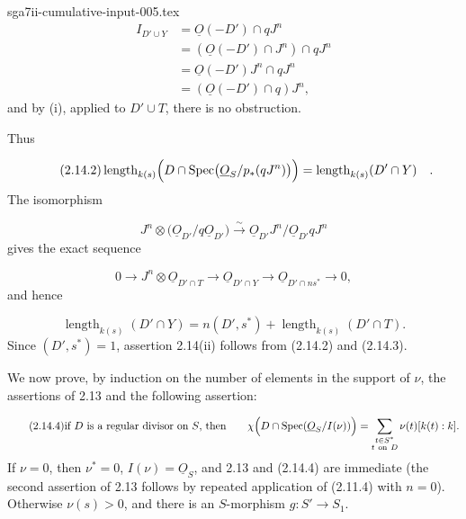 \begin{filecontents*}{sga7ii-cumulative-input-005.tex}
\begin{equation*}
\begin{aligned}
I_{D'\cup Y}
&=\underline{O}(-D')\cap qJ^n\\
&=(\underline{O}(-D')\cap J^n)\cap qJ^n\\
&=\underline{O}(-D')J^n\cap qJ^n\\
&=(\underline{O}(-D')\cap q)J^n,
\end{aligned}
\end{equation*}
and by (i), applied to $D'\cup T$, there is no obstruction.

Thus

\begin{equation}\tag{2.14.2}
\operatorname{length}_{k(s)}
\Bigl(D\cap
\operatorname{Spec}\bigl(\underline{O}_S/p_*(qJ^n)\bigr)\Bigr)
=\operatorname{length}_{k(s)}(D'\cap Y) \quad .
\end{equation}
The isomorphism

\begin{equation*}
J^n\otimes
\bigl(\underline{O}_{D'}/q\underline{O}_{D'}\bigr)
\xrightarrow{\;\sim\;}
\underline{O}_{D'}J^n/
\underline{O}_{D'}qJ^n
\end{equation*}
gives the exact sequence

\begin{equation*}
0\longrightarrow
J^n\otimes\underline{O}_{D'\cap T}
\longrightarrow\underline{O}_{D'\cap Y}
\longrightarrow\underline{O}_{D'\cap ns^*}
\longrightarrow0,
\end{equation*}
and hence


\begin{equation}\tag{2.14.3}
\operatorname{length}_{k(s)}(D'\cap Y)
=n(D',s^*)+\operatorname{length}_{k(s)}(D'\cap T).
\end{equation}
Since $(D',s^*)=1$, assertion 2.14(ii) follows from (2.14.2) and (2.14.3).

We now prove, by induction on the number of elements in the support of $\nu$,
the assertions of 2.13 and the following assertion:

\begin{equation}\tag{2.14.4}
\text{if $D$ is a regular divisor on $S$, then}\qquad
\chi\Bigl(D\cap\operatorname{Spec}(\underline{O}_S/I(\nu))\Bigr)
=\sum_{\substack{t\in S^*\\t\ \mathrm{on}\ D}}
\nu(t)[k(t):k].
\end{equation}
If $\nu=0$, then $\nu^*=0$, $I(\nu)=\underline{O}_S$, and 2.13 and (2.14.4)
are immediate (the second assertion of 2.13 follows by repeated application of
(2.11.4) with $n=0$).  Otherwise $\nu(s)>0$, and there is an $S$-morphism
$g:S'\longrightarrow S_1$.


\end{filecontents*}
